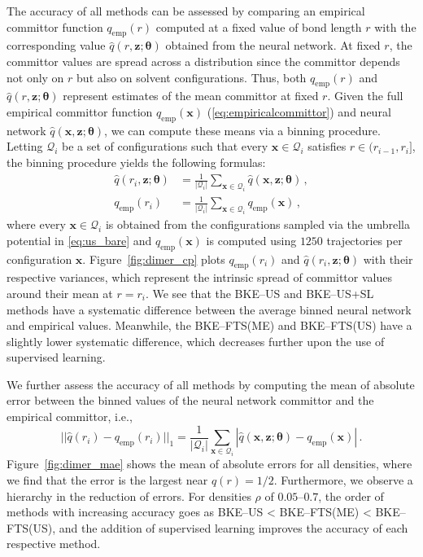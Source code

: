 \documentclass{article}
\numberwithin{equation}{section}
\def\*#1{\mathbf{#1}}
\theoremstyle{definition}
\theoremstyle{remark}
\def\thetab{\boldsymbol{\theta}}
\begin{document}
The accuracy of all methods can be assessed by comparing an empirical committor function $q_\mathrm{emp}(r)$ computed at a fixed value of bond length $ r $ with the corresponding value $\hat{q}(r, \* z; \thetab)$ obtained from the neural network. At fixed $r$, the committor values are spread across a distribution since the committor depends not only on $r$ but also on solvent configurations. Thus, both $q_\mathrm{emp}(r)$ and $\hat{q}(r, \* z; \thetab)$ represent estimates of the mean committor at fixed $r$. 
Given the full empirical committor function $q_\mathrm{emp} (\* x )$ (\cref{eq:empiricalcommittor}) and neural network $\hat{q} (\* x, \* z; \thetab)$, we can compute these means via a binning procedure. Letting $ \mathcal{Q}_i $ be a set of configurations such that every $ \* x \in \mathcal{Q}_{i} $ satisfies $ r \in ( r_{i-1} , r_{i} ] $, the binning procedure yields the following formulas: 
\begin{align}
    \hat{q} ( r_{i}, \* z ; \thetab ) &= \frac{1}{| \mathcal{Q}_{i} |} \sum_{\* x \in \mathcal{Q}_{i}} \hat{q} (\* x, \* z; \thetab) \label{eq:committor_nn_binned} \,, \\ 
    q_\mathrm{emp} ( r_{i}) &= \frac{1}{| \mathcal{Q}_{i} |} \sum_{\* x \in \mathcal{Q}_{i}} q_\mathrm{emp} (\* x ) \,, \label{eq:committor_emp_binned}
\end{align}
where every $\* x \in \mathcal{Q}_{i}$ is obtained from the configurations sampled via the umbrella potential in \cref{eq:us_bare} and $q_\mathrm{emp} (\* x) $ is computed using $ 1250 $ trajectories per configuration $\* x$.  
Figure~\ref{fig:dimer_cp} plots $q_\mathrm{emp}(r_i)$ and $\hat{q}(r_i, \* z; \thetab)$ with their respective variances, which represent the intrinsic spread of committor values around their mean at $r=r_i$. 
We see that the BKE--US and BKE--US+SL methods have a systematic difference between the average binned neural network and empirical values. Meanwhile, the
BKE--FTS(ME) and BKE--FTS(US) have a slightly lower systematic difference, which decreases further upon the use of supervised learning.




We further assess the accuracy of all methods by computing the mean of absolute error between the binned values of the neural network committor and the empirical committor, i.e.,
\begin{equation}
    ||\hat{q} ( r_{i} )-q_\mathrm{emp} ( r_{i} ) ||_{1}= \frac{1}{| \mathcal{Q}_{i} |} \sum_{\* x \in \mathcal{Q}_{i}} |\hat{q}(\* x, \* z; \thetab)-q_\mathrm{emp} (\* x)| \,. \label{eq:l1_dimer_binned}
\end{equation}
Figure~\ref{fig:dimer_mae} shows the mean of absolute errors for all densities, where we find that the error is the largest near $q(r)=1/2$. Furthermore, we observe a hierarchy in the reduction of errors. For densities $\rho$ of $ 0.05 \text{--} 0.7  $, the order of methods with increasing accuracy goes as BKE--US < BKE--FTS(ME) < BKE--FTS(US), and the addition of supervised learning improves the accuracy of each respective method. 
\end{document}
